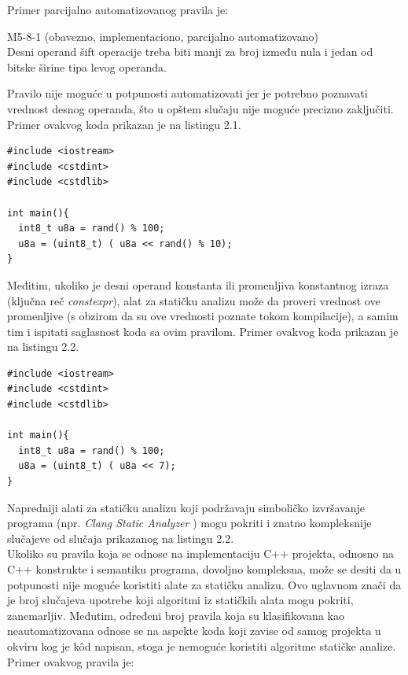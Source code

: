 \documentclass[12pt,oneside]{memoir}
\begin{document}
Primer parcijalno automatizovanog pravila je: 

\begin{center}

\begin{tcolorbox}
 M5-8-1 (obavezno, implementaciono, parcijalno automatizovano) \\
Desni operand šift operacije treba biti manji za broj između nula i jedan
od bitske širine tipa levog operanda.

\end{tcolorbox}
\end{center}
  \noindent
  Pravilo nije moguće u potpunosti automatizovati jer je potrebno poznavati vrednost desnog operanda, što u opštem slučaju nije
  moguće precizno zaključiti. Primer ovakvog koda prikazan je na listingu 2.1. \\


\begin{lstlisting}[style=customc, caption={K\^{o}d za koji stati\v{c}ka analiza u op\v{s}tem slu\v{c}aju ne mo\v{z}e da d\^{a} precizne rezultate.},label={lst:label1}]
#include <iostream>
#include <cstdint>
#include <cstdlib>

int main(){
  int8_t u8a = rand() % 100;
  u8a = (uint8_t) ( u8a << rand() % 10);
}
\end{lstlisting}
Međitim, ukoliko je desni operand konstanta ili promenljiva konstantnog izraza (klju\v{c}na re\v{c} \textit{constexpr}), alat za stati\v{c}ku analizu mo\v{z}e da proveri vrednost ove promenljive (s obzirom da su ove vrednosti poznate tokom kompilacije), a samim tim i ispitati saglasnost koda sa ovim pravilom.
  Primer ovakvog koda prikazan je na listingu 2.2. \\

\begin{lstlisting}[style=customc, caption={K\^{o}d čija se ispravnost jednostavno može utvrditi statičkom analizom.},label={lst:label2}]
#include <iostream>
#include <cstdint>
#include <cstdlib>

int main(){
  int8_t u8a = rand() % 100;
  u8a = (uint8_t) ( u8a << 7);
}
\end{lstlisting}

  Napredniji alati za statičku analizu koji podržavaju simboličko izvršavanje programa (npr. \textit{Clang Static Analyzer} \cite{CSAWebsite}) mogu pokriti i znatno kompleksnije 
  slučajeve od slučaja prikazanog na listingu 2.2.
  \\
  \indent 
  Ukoliko su pravila koja se odnose na implementaciju C++ projekta, odnosno na C++ konstrukte i semantiku programa, dovoljno kompleksna, može se desiti da u potpunosti nije moguće koristiti alate za statičku analizu. Ovo uglavnom znači da je broj slučajeva upotrebe koji algoritmi iz statičkih alata mogu pokriti, zanemarljiv. Međutim, određeni broj pravila koja su klasifikovana kao neautomatizovana odnose se na aspekte koda koji zavise od samog projekta
  u okviru kog je k\^{o}d napisan, stoga je nemoguće koristiti algoritme statičke analize.
  Primer ovakvog pravila je:
\end{document}
